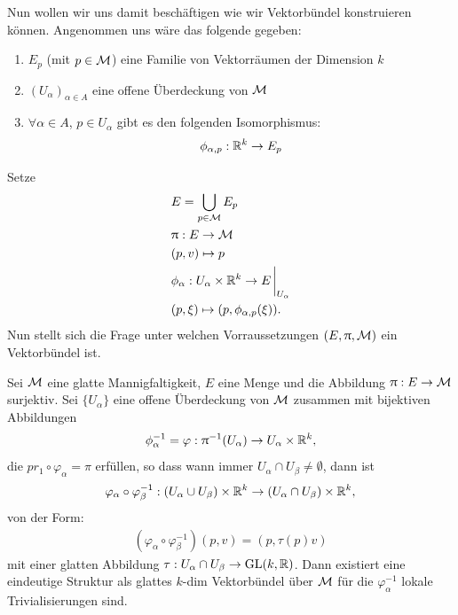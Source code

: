 Nun wollen wir uns damit beschäftigen wie wir Vektorbündel konstruieren können.
Angenommen uns wäre das folgende gegeben:
\begin{enumerate}
\item $E_p$ (mit $p\in \mathcal{M}$) eine Familie von Vektorräumen der Dimension $k$
\item $(U_\alpha)_{\alpha \in A}$ eine offene Überdeckung von $\mathcal{M}$
\item $\forall \alpha \in A$, $p\in U_\alpha$ gibt es den folgenden Isomorphismus:
\begin{align}
\phi_{\alpha, p}: \mathbb{R}^k \to E_p
\end{align}
\end{enumerate}
Setze 
\begin{align}
&E = \bigcup_{p \in \mfk} E_p\\
&\pi : E \to \mfk\\
&(p, v) \mapsto p\\
&\phi_\alpha: U_\alpha \times \R^k \to E \eval_{U_\alpha}\\
&(p, \xi) \mapsto (p, \phi_{\alpha, p}(\xi)).
\end{align}
Nun stellt sich die Frage unter welchen Vorraussetzungen $(E, \uppi, \mathcal{M})$ ein Vektorbündel ist.
\begin{lem}
\label{lem:vorraussetzungenvektorbündel}
Sei $\mathcal{M}$ eine glatte Mannigfaltigkeit, $E$ eine Menge und die Abbildung $\uppi: E\to\mathcal{M}$ surjektiv.
Sei $\{ U_\alpha \}$ eine offene Überdeckung von $\mathcal{M}$ zusammen mit bijektiven Abbildungen
\begin{align}
\phi^{-1}_{\alpha} = \varphi: \uppi^{-1}(U_\alpha) \to U_\alpha \times \mathbb{R}^k,
\end{align}
die $pr_1 \circ \varphi_\alpha = \pi$ erfüllen, so dass wann immer $U_\alpha \cap U_\beta \neq \emptyset$, dann ist 
\begin{align}
\varphi_\alpha \circ \varphi_{\beta}^{-1} : (U_\alpha \cup U_\beta) \times \mathbb{R}^k \to (U_\alpha \cap U_\beta) \times \mathbb{R}^k,
\end{align}
von der Form:
\begin{align}
\label{eq:konstruktionvektorbündel}
(\varphi_\alpha \circ \varphi_{\beta}^{-1})(p, v) = (p, \tau(p) v)
\end{align}
mit einer glatten Abbildung $\tau: U_\alpha \cap U_\beta \to \mathrm{GL}(k, \mathbb{R})$.
Dann existiert eine eindeutige Struktur als glattes $k$-dim Vektorbündel über $\mathcal{M}$ für die $\varphi^{-1}_{\alpha}$ lokale Trivialisierungen sind.
\end{lem}
